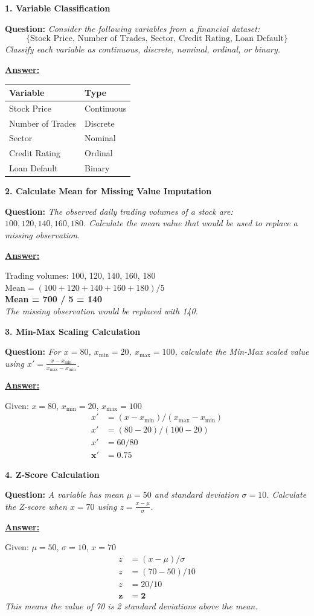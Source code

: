 \documentclass[11pt,a4paper]{article}
\newcommand{\questiontitle}[2]{%
    \vspace{0.4cm}%
    \noindent\textbf{\large\color{headerblue}#1. #2}\par\vspace{0.15cm}%
}
\newcommand{\qprompt}[1]{%
    \noindent\textbf{Question:} \textit{#1}\par\vspace{0.2cm}%
}
\newcommand{\answer}{\noindent\textbf{\underline{Answer:}}\par\vspace{0.15cm}}
\begin{document}
\questiontitle{1}{Variable Classification}
\qprompt{Consider the following variables from a financial dataset:
\[
\{\text{Stock Price},\, \text{Number of Trades},\, \text{Sector},\, \text{Credit Rating},\, \text{Loan Default}\}
\]
Classify each variable as continuous, discrete, nominal, ordinal, or binary.}
\answer
\begin{center}
\begin{tabular}{ll}
\toprule
\textbf{Variable} & \textbf{Type} \\
\midrule
Stock Price & Continuous \\
Number of Trades & Discrete \\
Sector & Nominal \\
Credit Rating & Ordinal \\
Loan Default & Binary \\
\bottomrule
\end{tabular}
\end{center}

\vspace{0.35cm}

\questiontitle{2}{Calculate Mean for Missing Value Imputation}
\qprompt{The observed daily trading volumes of a stock are: $100, 120, 140, 160, 180$. Calculate the mean value that would be used to replace a missing observation.}
\answer
Trading volumes: 100, 120, 140, 160, 180\\[0.3em]
$\text{Mean} = (100 + 120 + 140 + 160 + 180) / 5$\\[0.2em]
\textbf{Mean = 700 / 5 = 140}\\[0.4em]
\textit{The missing observation would be replaced with 140.}

\vspace{0.35cm}

\questiontitle{3}{Min-Max Scaling Calculation}
\qprompt{For $x = 80$, $x_{\min} = 20$, $x_{\max} = 100$, calculate the Min-Max scaled value using $x' = \frac{x - x_{\min}}{x_{\max} - x_{\min}}$.}
\answer
Given: $x = 80$, $x_{\min} = 20$, $x_{\max} = 100$
\begin{align*}
x' &= (x - x_{\min}) / (x_{\max} - x_{\min}) \\
x' &= (80 - 20) / (100 - 20) \\
x' &= 60 / 80 \\
\mathbf{x'} &= \mathbf{0.75}
\end{align*}

\vspace{0.35cm}

\questiontitle{4}{Z-Score Calculation}
\qprompt{A variable has mean $\mu = 50$ and standard deviation $\sigma = 10$. Calculate the Z-score when $x = 70$ using $z = \frac{x - \mu}{\sigma}$.}
\answer
Given: $\mu = 50$, $\sigma = 10$, $x = 70$
\begin{align*}
z &= (x - \mu) / \sigma \\
z &= (70 - 50) / 10 \\
z &= 20 / 10 \\
\mathbf{z} &= \mathbf{2}
\end{align*}
\textit{This means the value of 70 is 2 standard deviations above the mean.}
\end{document}
